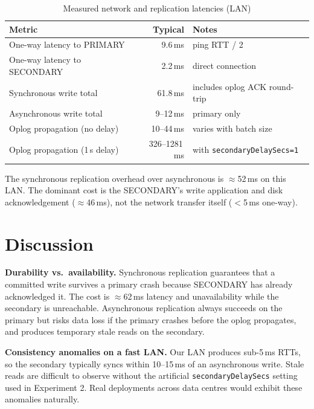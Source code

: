 \documentclass[12pt,a4paper]{article}
\newcommand{\code}[1]{\texttt{\small #1}}
\begin{document}
\begin{table}[H]
  \centering
  \caption{Measured network and replication latencies (LAN)}
  \begin{tabularx}{\textwidth}{lrX}
    \toprule
    Metric & Typical & Notes \\
    \midrule
    One-way latency to PRIMARY    & 9.6\,ms        & ping RTT / 2 \\
    One-way latency to SECONDARY  & 2.2\,ms        & direct connection \\
    Synchronous write total       & 61.8\,ms       & includes oplog ACK round-trip \\
    Asynchronous write total      & 9--12\,ms      & primary only \\
    Oplog propagation (no delay)  & 10--44\,ms     & varies with batch size \\
    Oplog propagation (1\,s delay)& 326--1281\,ms  & with \code{secondaryDelaySecs=1} \\
    \bottomrule
  \end{tabularx}
\end{table}

The synchronous replication overhead over asynchronous is $\approx$52\,ms on this LAN.
The dominant cost is the SECONDARY's write application and disk acknowledgement
($\approx$46\,ms), not the network transfer itself ($<$5\,ms one-way).

\section{Discussion}

\textbf{Durability vs.\ availability.}
Synchronous replication guarantees that a committed write survives a primary crash because
SECONDARY has already acknowledged it. The cost is $\approx$62\,ms latency and
unavailability while the secondary is unreachable. Asynchronous replication always
succeeds on the primary but risks data
loss if the primary crashes before the oplog propagates, and produces temporary stale
reads on the secondary.

\textbf{Consistency anomalies on a fast LAN.}
Our LAN produces sub-5\,ms RTTs, so the secondary typically syncs within 10--15\,ms of
an asynchronous write. Stale reads are difficult to observe without the artificial
\code{secondaryDelaySecs} setting used in Experiment 2. Real deployments across data
centres would exhibit these anomalies naturally.
\end{document}
